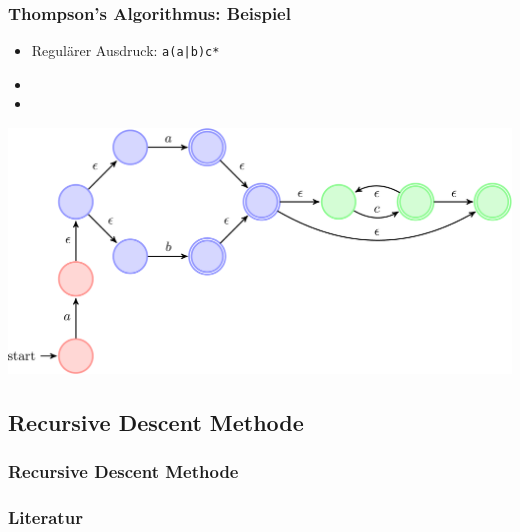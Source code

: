 \documentclass[ignorenonframetext]{beamer}
\begin{document}
\begin{frame}[plain]
    \frametitle{Thompson's Algorithmus: Beispiel}
	\begin{itemize}
		\item[] Regulärer Ausdruck: \texttt{a(a|b)c*}
		\item[]
		\item[]
	\end{itemize}
	\begin{centering}
		\includegraphics[scale=0.23]{aabc.pdf}
	\end{centering}
\end{frame}


\subsection{Recursive Descent Methode}
\begin{frame}
    \frametitle{Recursive Descent Methode}

\end{frame}





\begin{frame}[allowframebreaks]
    \frametitle{Literatur}
    
    
    \nocite{*}
\end{frame}


\begin{frame}[plain]
\end{frame}
\end{document}
